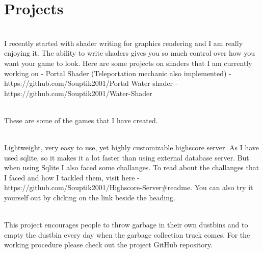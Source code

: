 \documentclass[]{deedy-resume-openfont}
\begin{document}
       \section{Projects}
       \raggedright
         
       
           \hfill {}\\
           I recently started with shader writing for graphics rendering and I am really enjoying it. The ability to write shaders gives you so much control over how you want your game to look. Here are some projects on shaders that I am currently working on - Portal Shader (Teleportation mechanic also implemented) - https://github.com/Souptik2001/Portal
Water shader - https://github.com/Souptik2001/Water-Shader\\
           \sectionsep
           
           
           \hfill {}\\
           These are some of the games that I have created.\\
           \sectionsep
           
           
           
           \hfill {}\\
           Lightweight, very easy to use, yet highly customizable highscore server. As I have used sqlite, so it makes it a lot faster than using external database server. But when using Sqlite I also faced some challanges. To read about the challanges that I faced and how I tackled them, visit here - https://github.com/Souptik2001/Highscore-Server\#readme. You can also try it yourself out by clicking on the link beside the heading.\\
           \sectionsep
         
         
       
           \hfill {}\\
           This project encourages people to throw garbage in their own dustbins and to empty the dustbin every day when the garbage collection truck comes. For the working procedure please check out the project GitHub repository.\\
           \sectionsep
         
\end{document}
